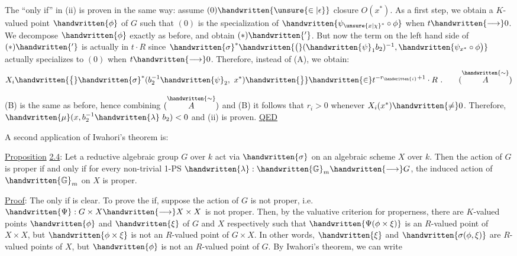 The ``only if'' in (ii) is proven in the same way: assume $(0)\handwritten{\unsure{\in|\epsilon}}$ closure $O(x^*)$. As a first step, we obtain a $K$-valued point $\handwritten{\phi}$ of $G$ such that $(0)$ is the specialization of $\handwritten{\psi_{{\unsure{x|\chi}}^*}\circ\phi}$ when $t\handwritten{\longrightarrow}0$. We decompose $\handwritten{\phi}$ exactly as before, and obtain $(*)\handwritten{'}$. But now the term on the left hand side of $(*)\handwritten{'}$ is actually in $t\cdot R$ since $\handwritten{\sigma}^{*}\handwritten{\bigl(}(\handwritten{\psi}_1 b_2)^{-1},\handwritten{\psi_{x^*}\circ\phi\bigr)}$ actually specializes to $(0)$ when $t\handwritten{\longrightarrow}0$. Therefore, instead of (A), we obtain:
\[
X_i\handwritten{\bigl\{}\handwritten{\sigma}^{*}(b_2^{-1}\handwritten{\psi}_2,\ x^*)\handwritten{\bigr\}}\handwritten{\in}t^{-r_{\handwritten{i}}+1}\cdot R\ .
\tag*{($\overset{\handwritten{\sim}}{A}$)}
\]

(B) is the same as before, hence combining $(\overset{\handwritten{\sim}}{A})$ and (B) it follows that $r_i>0$ whenever $X_i(x^*)\handwritten{\neq}0$. Therefore, $\handwritten{\mu}(x,b_2^{-1}\handwritten{\lambda}\ b_2)<0$ and (ii) is proven. \uline{QED}

A second application of Iwahori's theorem is:

\uline{Proposition} \uline{2.4}: Let a reductive algebraic group $G$ over $k$ act via $\handwritten{\sigma}$ on an algebraic scheme $X$ over $k$. Then the action of $G$ is proper if and only if for every non-trivial 1-PS $\handwritten{\lambda}:\handwritten{\mathbb{G}}_m\handwritten{\longrightarrow}G$, the induced action of $\handwritten{\mathbb{G}}_m$ on $X$ is proper.

\uline{Proof}: The only if is clear. To prove the if, suppose the action of $G$ is not proper, i.e. $\handwritten{\Psi}:G\times X\handwritten{\longrightarrow}X\times X$ is not proper. Then, by the valuative criterion for properness, there are $K$-valued points $\handwritten{\phi}$ and $\handwritten{\xi}$ of $G$ and $X$ respectively such that $\handwritten{\Psi(\phi\times\xi)}$ is an $R$-valued point of $X\times X$, but $\handwritten{\phi\times\xi}$ is not an $R$-valued point of $G\times X$. In other words, $\handwritten{\xi}$ and $\handwritten{\sigma(\phi,\xi)}$ are $R$-valued points of $X$, but $\handwritten{\phi}$ is not an $R$-valued point of $G$. By Iwahori's theorem, we can write
